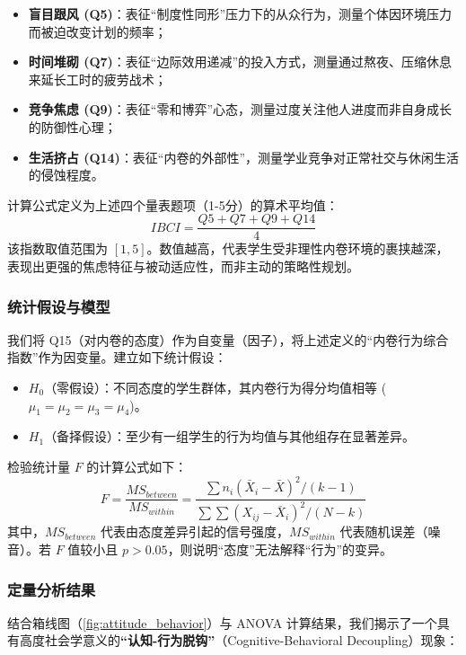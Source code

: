 \documentclass[win,thesis]{hustreport} %
\begin{document}
\begin{itemize}
	\item \textbf{盲目跟风 (Q5)}：表征“制度性同形”压力下的从众行为，测量个体因环境压力而被迫改变计划的频率；
	\item \textbf{时间堆砌 (Q7)}：表征“边际效用递减”的投入方式，测量通过熬夜、压缩休息来延长工时的疲劳战术；
	\item \textbf{竞争焦虑 (Q9)}：表征“零和博弈”心态，测量过度关注他人进度而非自身成长的防御性心理；
	\item \textbf{生活挤占 (Q14)}：表征“内卷的外部性”，测量学业竞争对正常社交与休闲生活的侵蚀程度。
\end{itemize}

计算公式定义为上述四个量表题项（1-5分）的算术平均值：
\begin{equation}
	IBCI = \frac{Q5 + Q7 + Q9 + Q14}{4}
\end{equation}
该指数取值范围为 $[1, 5]$。数值越高，代表学生受非理性内卷环境的裹挟越深，表现出更强的焦虑特征与被动适应性，而非主动的策略性规划。

\subsubsection{统计假设与模型}
我们将 Q15（对内卷的态度）作为自变量（因子），将上述定义的“内卷行为综合指数”作为因变量。建立如下统计假设：
\begin{itemize}
	\item $H_0$（零假设）：不同态度的学生群体，其内卷行为得分均值相等 ($\mu_1 = \mu_2 = \mu_3 = \mu_4$)。
	\item $H_1$（备择假设）：至少有一组学生的行为均值与其他组存在显著差异。
\end{itemize}

检验统计量 $F$ 的计算公式如下：
\begin{equation}
	F = \frac{MS_{between}}{MS_{within}} = \frac{\sum n_i(\bar{X}_i - \bar{X})^2 / (k-1)}{\sum \sum (X_{ij} - \bar{X}_i)^2 / (N-k)}
\end{equation}
其中，$MS_{between}$ 代表由态度差异引起的信号强度，$MS_{within}$ 代表随机误差（噪音）。若 $F$ 值较小且 $p > 0.05$，则说明“态度”无法解释“行为”的变异。

\subsubsection{定量分析结果}
结合箱线图（\ref{fig:attitude_behavior}）与 ANOVA 计算结果，我们揭示了一个具有高度社会学意义的\textbf{“认知-行为脱钩”}（Cognitive-Behavioral Decoupling）现象：
\end{document}
